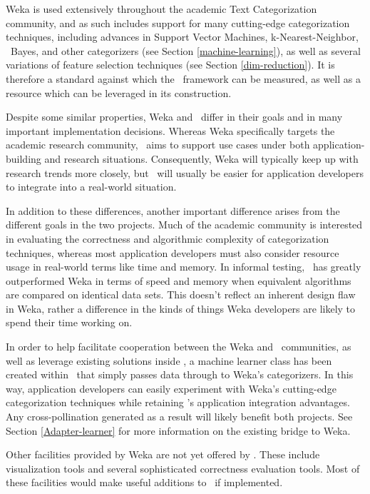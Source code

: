 Weka is used extensively throughout the academic Text Categorization
community, and as such includes support for many cutting-edge
categorization techniques, including advances in Support Vector
Machines, k-Nearest-Neighbor, \naive\ Bayes, and other categorizers
(see Section \ref{machine-learning}), as well as several variations of
feature selection techniques (see Section \ref{dim-reduction}).  It is
therefore a standard against which the \aicat\ framework can
be measured, as well as a resource which can be leveraged in its
construction.

Despite some similar properties, Weka and \aicat\ differ in
their goals and in many important implementation decisions.  Whereas
Weka specifically targets the academic research community,
\aicat\ aims to support use cases under both
application-building and research situations.
Consequently, Weka will typically keep up with research trends more
closely, but \aicat\ will usually be easier for application
developers to integrate into a real-world situation.

In addition to these differences, another important difference arises
from the different goals in the two projects.  Much of the academic
community is interested in evaluating the correctness and algorithmic
complexity of categorization techniques, whereas most application
developers must also consider resource usage in real-world terms like
time and memory.  In informal testing, \aicat\ has greatly outperformed
Weka in terms of speed and memory when equivalent algorithms are
compared on identical data sets.  This doesn't reflect an inherent
design flaw in Weka, rather a difference in the kinds of things Weka
developers are likely to spend their time working on.

In order to help facilitate cooperation between the Weka and
\aicat\ communities, as well as leverage existing solutions
inside \aicat, a machine learner class has been created
within \aicat\ that simply passes data through to Weka's
categorizers.  In this way, application developers can easily
experiment with Weka's cutting-edge categorization techniques while
retaining \aicat's application integration advantages.  Any
cross-pollination generated as a result will likely benefit both
projects.  See Section \ref{Adapter-learner} for more information on
the existing bridge to Weka.

Other facilities provided by Weka are not yet offered by
\aicat.  These include visualization tools and several
sophisticated correctness evaluation tools.  Most of these
facilities would make useful additions to \aicat\ if
implemented.

